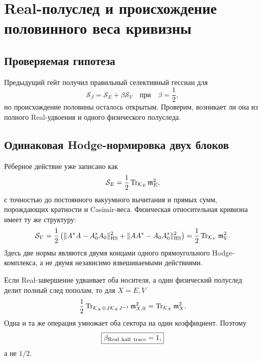 \chapter{Real-полуслед и происхождение половинного веса кривизны}
\label{ch:v7-real-half-trace-curvature-weight-gate}

\section{Проверяемая гипотеза}

Предыдущий гейт получил правильный селективный гессиан для
\begin{equation}
 \mathcal S_\beta=\mathcal S_E+\beta\mathcal S_V
 \quad\text{при}\quad \beta=\frac12,
 \label{eq:v7-half-trace-target}
\end{equation}
но происхождение половины осталось открытым. Проверим, возникает ли она из
полного Real-удвоения и одного физического полуследа.

\section{Одинаковая Hodge-нормировка двух блоков}

Рёберное действие уже записано как
\begin{equation}
 \mathcal S_E=\frac12\operatorname{Tr}_{\mathcal K_E}\mathfrak m_E^2,
 \label{eq:v7-half-trace-edge-hodge}
\end{equation}
с точностью до постоянного вакуумного вычитания и прямых сумм, порождающих
кратности и Casimir-веса. Физическая относительная кривизна имеет ту же
структуру:
\begin{equation}
 \mathcal S_V=\frac12\left(
 \|A^*A-A_0^*A_0\|_{\rm HS}^2+
 \|AA^*-A_0A_0^*\|_{\rm HS}^2\right)
 =\frac12\operatorname{Tr}_{\mathcal K_V}\mathfrak m_V^2.
 \label{eq:v7-half-trace-vertex-hodge}
\end{equation}
Здесь две нормы являются двумя концами одного прямоугольного Hodge-комплекса,
а не двумя независимо взвешиваемыми действиями.

Если Real-завершение удваивает оба носителя, а один физический полуслед делит
полный след пополам, то для $X=E,V$
\begin{equation}
 \frac12\operatorname{Tr}_{\mathcal K_X\oplus J\mathcal K_XJ^{-1}}
 \mathfrak m_{X,\mathbb R}^2
 =\operatorname{Tr}_{\mathcal K_X}\mathfrak m_X^2.
 \label{eq:v7-half-trace-uniform-cancellation}
\end{equation}
Одна и та же операция умножает оба сектора на один коэффициент. Поэтому
\begin{equation}
 \boxed{\beta_{\rm Real\ half\ trace}=1,}
 \label{eq:v7-half-trace-derived-beta-one}
\end{equation}
а не $1/2$.

